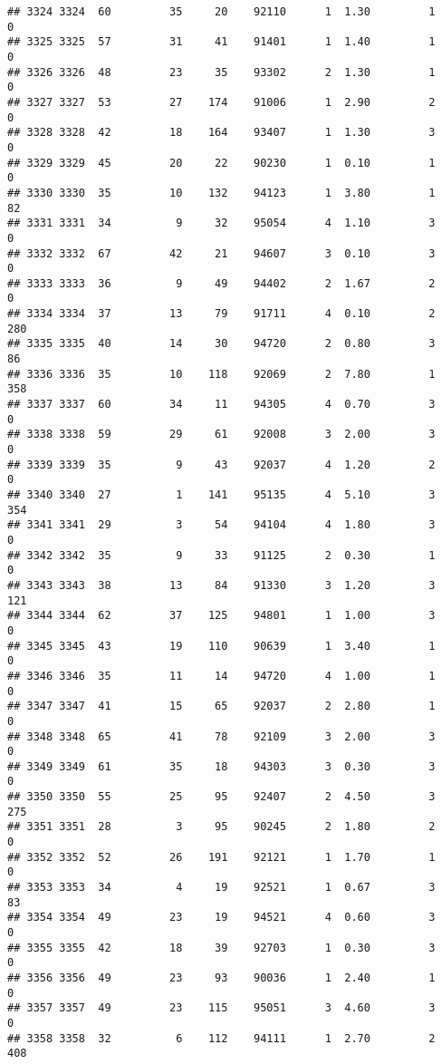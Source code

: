 \documentclass[
]{article}
\begin{document}
\begin{verbatim}
## 3324 3324  60         35     20    92110      1  1.30         1        0
## 3325 3325  57         31     41    91401      1  1.40         1        0
## 3326 3326  48         23     35    93302      2  1.30         1        0
## 3327 3327  53         27    174    91006      1  2.90         2        0
## 3328 3328  42         18    164    93407      1  1.30         3        0
## 3329 3329  45         20     22    90230      1  0.10         1        0
## 3330 3330  35         10    132    94123      1  3.80         1       82
## 3331 3331  34          9     32    95054      4  1.10         3        0
## 3332 3332  67         42     21    94607      3  0.10         3        0
## 3333 3333  36          9     49    94402      2  1.67         2        0
## 3334 3334  37         13     79    91711      4  0.10         2      280
## 3335 3335  40         14     30    94720      2  0.80         3       86
## 3336 3336  35         10    118    92069      2  7.80         1      358
## 3337 3337  60         34     11    94305      4  0.70         3        0
## 3338 3338  59         29     61    92008      3  2.00         3        0
## 3339 3339  35          9     43    92037      4  1.20         2        0
## 3340 3340  27          1    141    95135      4  5.10         3      354
## 3341 3341  29          3     54    94104      4  1.80         3        0
## 3342 3342  35          9     33    91125      2  0.30         1        0
## 3343 3343  38         13     84    91330      3  1.20         3      121
## 3344 3344  62         37    125    94801      1  1.00         3        0
## 3345 3345  43         19    110    90639      1  3.40         1        0
## 3346 3346  35         11     14    94720      4  1.00         1        0
## 3347 3347  41         15     65    92037      2  2.80         1        0
## 3348 3348  65         41     78    92109      3  2.00         3        0
## 3349 3349  61         35     18    94303      3  0.30         3        0
## 3350 3350  55         25     95    92407      2  4.50         3      275
## 3351 3351  28          3     95    90245      2  1.80         2        0
## 3352 3352  52         26    191    92121      1  1.70         1        0
## 3353 3353  34          4     19    92521      1  0.67         3       83
## 3354 3354  49         23     19    94521      4  0.60         3        0
## 3355 3355  42         18     39    92703      1  0.30         3        0
## 3356 3356  49         23     93    90036      1  2.40         1        0
## 3357 3357  49         23    115    95051      3  4.60         3        0
## 3358 3358  32          6    112    94111      1  2.70         2      408

\end{verbatim}
\end{document}

